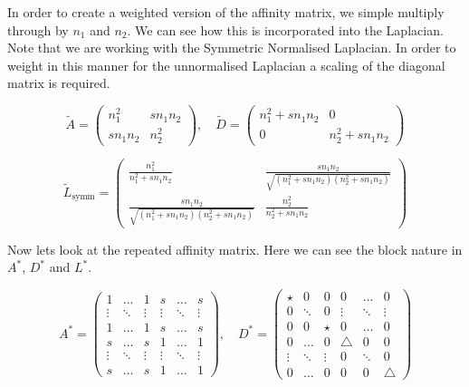 In order to create a weighted version of the affinity matrix, we simple multiply through by $n_1$ and $n_2$. We can see how this is incorporated into the Laplacian. Note that we are working with the Symmetric Normalised Laplacian. In order to weight in this manner for the unnormalised Laplacian a scaling of the diagonal matrix is required.  

\[ \tilde{A} = \left(
  \begin{array}{cc}
    n_1^2 & sn_1n_2 \\
    sn_1n_2 & n_2^2
  \end{array} \right) , \quad
%
 \tilde{D} = \left(
  \begin{array}{cc}
    n_1^2 + sn_1n_2 & 0 \\
    0 & n_2^2 + sn_1n_2
  \end{array} \right) \]

\[
 \tilde{L}_{\text{symm}} = \left(
  \begin{array}{cc}
   \frac{n_1^2}{n_1^2+sn_1n_2} & \frac{sn_1n_2}{\sqrt{(n_1^2+sn_1n_2)(n_2^2+sn_1n_2)}} \\
   \frac{sn_1n_2}{\sqrt{(n_1^2+sn_1n_2)(n_2^2+sn_1n_2)}} &  \frac{n_2^2}{n_2^2+sn_1n_2}
  \end{array} \right) \]

Now lets look at the repeated affinity matrix. Here we can see the block nature in $A^*$, $D^*$ and $L^*$.

\[ A^* = \left(
  \begin{array}{cccccc}
    1 & \hdots & 1 & s & \hdots & s \\
    \vdots & \ddots & \vdots & \vdots & \ddots & \vdots \\
    1 & \hdots & 1 & s & \hdots & s \\
   s & \hdots & s & 1 & \hdots & 1 \\
    \vdots & \ddots & \vdots & \vdots & \ddots & \vdots \\
    s & \hdots & s & 1 & \hdots & 1 
  \end{array} \right) , \quad
%
 D^* = \left(
  \begin{array}{cccccc}
    \star & 0 & 0 & 0 & \hdots & 0 \\
    0 & \ddots & 0 & \vdots & \ddots & \vdots \\
    0 & 0 & \star & 0 & \hdots & 0 \\
   0 & \hdots & 0 & \bigtriangleup & 0 & 0 \\
    \vdots & \ddots & \vdots & 0 & \ddots & 0 \\
    0 & \hdots & 0 & 0 & 0 & \bigtriangleup 
  \end{array} \right) \]

